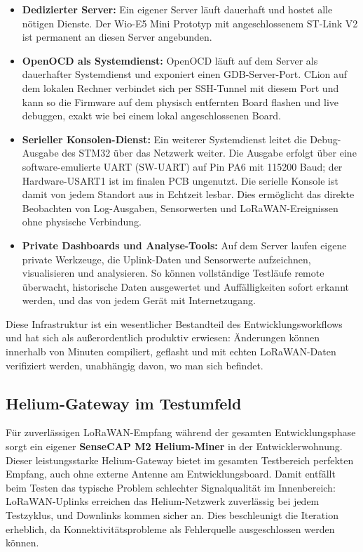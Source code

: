 \begin{itemize}
  \item \textbf{Dedizierter Server:} Ein eigener Server läuft dauerhaft und hostet alle nötigen Dienste. Der Wio-E5 Mini Prototyp mit angeschlossenem ST-Link V2 ist permanent an diesen Server angebunden.

  \item \textbf{OpenOCD als Systemdienst:} OpenOCD läuft auf dem Server als dauerhafter Systemdienst und exponiert einen GDB-Server-Port. CLion auf dem lokalen Rechner verbindet sich per SSH-Tunnel mit diesem Port und kann so die Firmware auf dem physisch entfernten Board flashen und live debuggen, exakt wie bei einem lokal angeschlossenen Board.

  \item \textbf{Serieller Konsolen-Dienst:} Ein weiterer Systemdienst leitet die Debug-Ausgabe des STM32 über das Netzwerk weiter. Die Ausgabe erfolgt über eine software-emulierte UART (SW-UART) auf Pin PA6 mit 115200 Baud; der Hardware-USART1 ist im finalen PCB ungenutzt. Die serielle Konsole ist damit von jedem Standort aus in Echtzeit lesbar. Dies ermöglicht das direkte Beobachten von Log-Ausgaben, Sensorwerten und LoRaWAN-Ereignissen ohne physische Verbindung.

  \item \textbf{Private Dashboards und Analyse-Tools:} Auf dem Server laufen eigene private Werkzeuge, die Uplink-Daten und Sensorwerte aufzeichnen, visualisieren und analysieren. So können vollständige Testläufe remote überwacht, historische Daten ausgewertet und Auffälligkeiten sofort erkannt werden, und das von jedem Gerät mit Internetzugang.
\end{itemize}

Diese Infrastruktur ist ein wesentlicher Bestandteil des Entwicklungsworkflows und hat sich als außerordentlich produktiv erwiesen: Änderungen können innerhalb von Minuten compiliert, geflasht und mit echten LoRaWAN-Daten verifiziert werden, unabhängig davon, wo man sich befindet.

\subsection*{Helium-Gateway im Testumfeld}

Für zuverlässigen LoRaWAN-Empfang während der gesamten Entwicklungsphase sorgt ein eigener \textbf{SenseCAP M2 Helium-Miner} in der Entwicklerwohnung. Dieser leistungsstarke Helium-Gateway bietet im gesamten Testbereich perfekten Empfang, auch ohne externe Antenne am Entwicklungsboard. Damit entfällt beim Testen das typische Problem schlechter Signalqualität im Innenbereich: LoRaWAN-Uplinks erreichen das Helium-Netzwerk zuverlässig bei jedem Testzyklus, und Downlinks kommen sicher an. Dies beschleunigt die Iteration erheblich, da Konnektivitätsprobleme als Fehlerquelle ausgeschlossen werden können.

